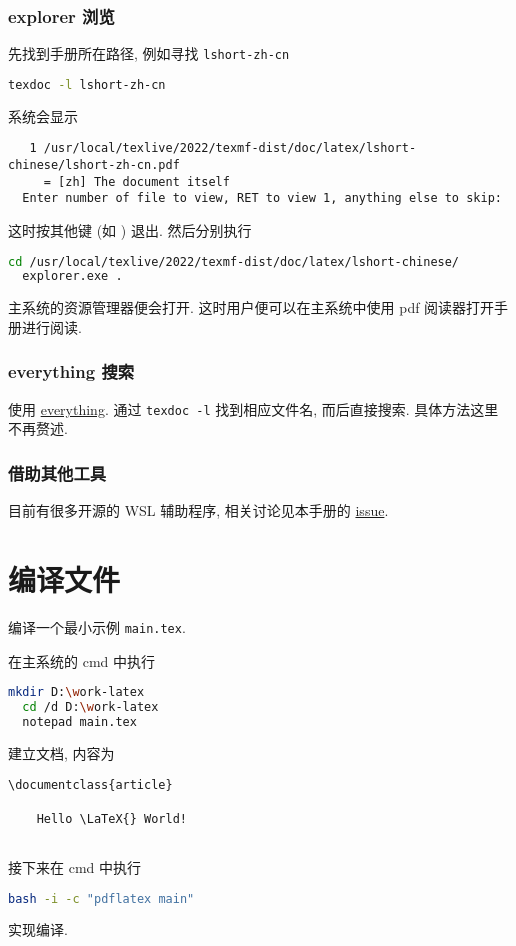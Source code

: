 \subsubsection{explorer 浏览}

先找到手册所在路径,
例如寻找 \texttt{lshort-zh-cn}
\begin{lstlisting}[language=bash]
  texdoc -l lshort-zh-cn
\end{lstlisting}
系统会显示
\begin{lstlisting}
   1 /usr/local/texlive/2022/texmf-dist/doc/latex/lshort-chinese/lshort-zh-cn.pdf
     = [zh] The document itself
  Enter number of file to view, RET to view 1, anything else to skip:
\end{lstlisting}
这时按其他键 (如 ) 退出.
然后分别执行
\begin{lstlisting}[language=bash]
  cd /usr/local/texlive/2022/texmf-dist/doc/latex/lshort-chinese/
  explorer.exe .
\end{lstlisting}
主系统的资源管理器便会打开.
这时用户便可以在主系统中使用 pdf 阅读器打开手册进行阅读.

\subsubsection{everything 搜索}

使用 \href{https://www.voidtools.com/zh-cn/}{everything}.
通过 \texttt{texdoc -l} 找到相应文件名,
而后直接搜索.
具体方法这里不再赘述.

\subsubsection{借助其他工具}

目前有很多开源的 WSL 辅助程序,
相关讨论见本手册的 \href{https://github.com/OsbertWang/install-latex-guide-zh-cn/issues/13}{issue}.

\section{编译文件}

编译一个最小示例 \texttt{main.tex}.

在主系统的 \textsf{cmd} 中执行
\begin{lstlisting}[language=bash]
  mkdir D:\work-latex
  cd /d D:\work-latex
  notepad main.tex
\end{lstlisting}
建立文档,
内容为
\begin{lstlisting}[language = {[LaTeX]TeX}]
  \documentclass{article}
  
    Hello \LaTeX{} World!
  
\end{lstlisting}
接下来在 \textsf{cmd} 中执行
\begin{lstlisting}[language=bash]
  bash -i -c "pdflatex main"
\end{lstlisting}
实现编译.

